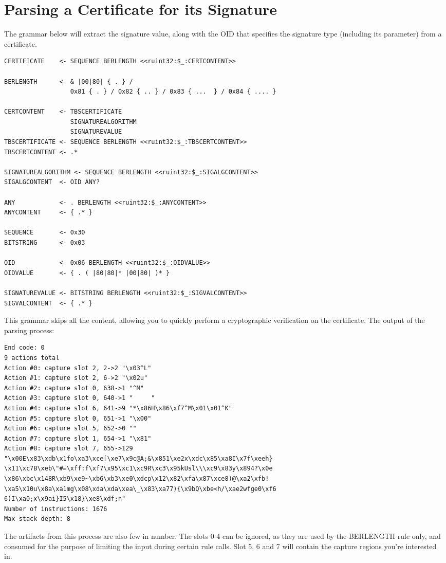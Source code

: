 \newpage
\section{Parsing a Certificate for its Signature}

The grammar below will extract the signature value, along with the OID 
that specifies the signature type (including its parameter) from a 
certificate.

\begin{changemargin}{-60mm}{0mm}
\begin{myquote}
\begin{verbatim}
CERTIFICATE    <- SEQUENCE BERLENGTH <<ruint32:$_:CERTCONTENT>>

BERLENGTH      <- & |00|80| { . } /
                  0x81 { . } / 0x82 { .. } / 0x83 { ...  } / 0x84 { .... }

CERTCONTENT    <- TBSCERTIFICATE
                  SIGNATUREALGORITHM
                  SIGNATUREVALUE
TBSCERTIFICATE <- SEQUENCE BERLENGTH <<ruint32:$_:TBSCERTCONTENT>>
TBSCERTCONTENT <- .*

SIGNATUREALGORITHM <- SEQUENCE BERLENGTH <<ruint32:$_:SIGALGCONTENT>>
SIGALGCONTENT  <- OID ANY?

ANY            <- . BERLENGTH <<ruint32:$_:ANYCONTENT>>
ANYCONTENT     <- { .* }

SEQUENCE       <- 0x30
BITSTRING      <- 0x03

OID            <- 0x06 BERLENGTH <<ruint32:$_:OIDVALUE>>
OIDVALUE       <- { . ( |80|80|* |00|80| )* }

SIGNATUREVALUE <- BITSTRING BERLENGTH <<ruint32:$_:SIGVALCONTENT>>
SIGVALCONTENT  <- { .* }
\end{verbatim}
\end{myquote}
\end{changemargin}

This grammar skips all the content, allowing you to quickly perform a 
cryptographic verification on the certificate. The output of the parsing 
process:

\begin{changemargin}{-60mm}{0mm}
\begin{myquote}
\begin{verbatim}
End code: 0
9 actions total
Action #0: capture slot 2, 2->2 "\x03^L"
Action #1: capture slot 2, 6->2 "\x02u"
Action #2: capture slot 0, 638->1 "^M"
Action #3: capture slot 0, 640->1 "     "
Action #4: capture slot 6, 641->9 "*\x86H\x86\xf7^M\x01\x01^K"
Action #5: capture slot 0, 651->1 "\x00"
Action #6: capture slot 5, 652->0 ""
Action #7: capture slot 1, 654->1 "\x81"
Action #8: capture slot 7, 655->129 
"\x00E\x83\xdb\x1fo\xa3\xce[\xe7\x9c@A;&\x851\xe2x\xdc\x85\xa8I\x7f\xeeh}
\x11\xc7B\xeb\"#=\xff:f\xf7\x95\xc1\xc9R\xc3\x95kUsl\\\xc9\x83y\x894?\x0e
\x86\xbc\x148R\xb9\xe9~\xb6\xb3\xe0\xdcp\x12\x82\xfa\x87\xce8)@\xa2\xfb!
\xa5\x10u\x8a\xa1mg\x08\xda\xda\xea\_\x83\xa77){\x9bQ\xbe<h/\xae2wfge0\xf6
6)I\xa0;x\x9ai}I5\x18}\xe8\xdf;n"
Number of instructions: 1676
Max stack depth: 8
\end{verbatim}
\end{myquote}
\end{changemargin}

The artifacts from this process are also few in number. The slots 0-4 can 
be ignored, as they are used by the BERLENGTH rule only, and consumed for 
the purpose of limiting the input during certain rule calls. Slot 5, 6 and 
7 will contain the capture regions you’re interested in.
